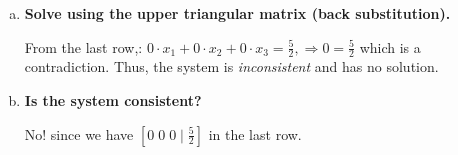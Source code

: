 \documentclass[a4paper,11pt,reqno]{amsart}
\numberwithin{equation}{section}
\begin{document}
\begin{center}
{{\begin{enumerate}[a)]
\[
R_3 + \tfrac{1}{2}R_2 \rightarrow R_3\; \text{to get the augmented system,}
\]

\[
\left[\begin{array}{ccc|c}
2 & -3 & 2 & 1\\[4pt]
0 & 1 & -4 & 8\\[4pt]
0 & 0 & 0 & \tfrac{5}{2}
\end{array}\right].
\]

This is upper triangular in the sense that all entries below the main diagonal are zero.

\item \textbf{Solve using the upper triangular matrix (back substitution).}

From the last row,:
\(
0\cdot x_1 + 0\cdot x_2 + 0\cdot x_3 = \tfrac{5}{2}, \Rightarrow 0 = \tfrac{5}{2}
\)
which is a contradiction. Thus,  the system is \emph{inconsistent} and has no solution.

\item \textbf{Is the system consistent?}

No! since we have \(
[0\; 0\; 0 \mid \tfrac{5}{2}]
\) in the last row.
\end{enumerate}

}}
\end{center}
\end{document}
